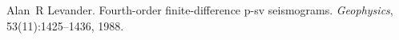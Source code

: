 
\begin{DoxyDescription}
\item[\label{_CITEREF_levander1988fourth}%
\mbox{[}1\mbox{]}]Alan~R Levander. Fourth-\/order finite-\/difference p-\/sv seismograms. {\itshape Geophysics}, 53(11)\-:1425--1436, 1988.


\end{DoxyDescription}